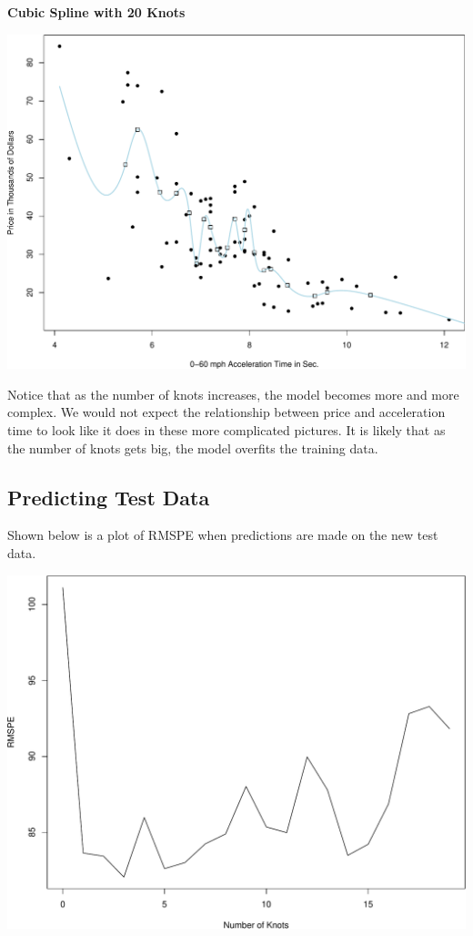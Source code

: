 \documentclass[
  letterpaper,
  DIV=11,
  numbers=noendperiod]{scrreprt}
\begin{document}
\textbf{Cubic Spline with 20 Knots}

\includegraphics{Ch7_files/figure-pdf/unnamed-chunk-72-1.pdf}

Notice that as the number of knots increases, the model becomes more and
more complex. We would not expect the relationship between price and
acceleration time to look like it does in these more complicated
pictures. It is likely that as the number of knots gets big, the model
overfits the training data.

\subsection{Predicting Test Data}\label{predicting-test-data}

Shown below is a plot of RMSPE when predictions are made on the new test
data.

\includegraphics{Ch7_files/figure-pdf/unnamed-chunk-73-1.pdf}
\end{document}
